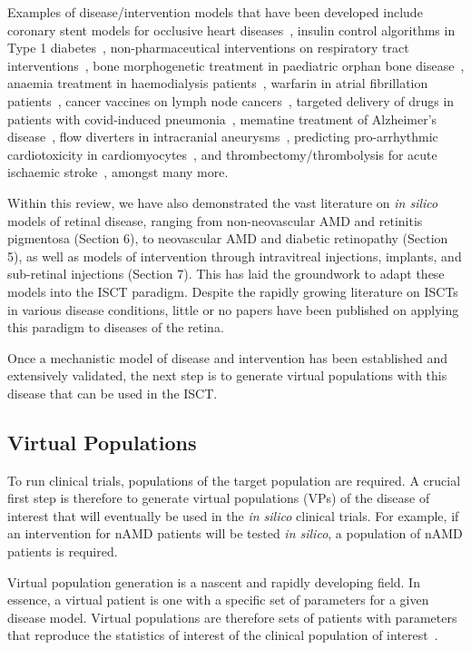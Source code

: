 \documentclass{article}
\begin{document}
Examples of disease/intervention models that have been developed include coronary stent models for occlusive heart diseases~\cite{Antonini2021, Berti2021}, insulin control algorithms in Type 1 diabetes~\cite{Kovatchev2009}, non-pharmaceutical interventions on respiratory tract interventions~\cite{Arsene2022}, bone morphogenetic treatment in paediatric orphan bone disease~\cite{Carlier2018}, anaemia treatment in haemodialysis patients~\cite{Fuertinger2018}, warfarin in atrial fibrillation patients~\cite{Ravvaz2017}, cancer vaccines on lymph node cancers~\cite{Gaffney2022}, targeted delivery of drugs in patients with covid-induced pneumonia~\cite{Wang2022}, mematine treatment of Alzheimer’s disease~\cite{Swietlik2022}, flow diverters in intracranial aneurysms~\cite{SarramiForoushani2021}, predicting pro-arrhythmic cardiotoxicity in cardiomyocytes~\cite{Passini2017}, and thrombectomy/thrombolysis for acute ischaemic stroke~\cite{Konduri2020}, amongst many more.

Within this review, we have also demonstrated the vast literature on \textit{in silico} models of retinal disease, ranging from non-neovascular AMD and retinitis pigmentosa (Section 6), to neovascular AMD and diabetic retinopathy (Section 5), as well as models of intervention through intravitreal injections, implants, and sub-retinal injections (Section 7). This has laid the groundwork to adapt these models into the ISCT paradigm. Despite the rapidly growing literature on ISCTs in various disease conditions, little or no papers have been published on applying this paradigm to diseases of the retina.

Once a mechanistic model of disease and intervention has been established and extensively validated, the next step is to generate virtual populations with this disease that can be used in the ISCT.

\subsection*{Virtual Populations}

To run clinical trials, populations of the target population are required. A crucial first step is therefore to generate virtual populations (VPs) of the disease of interest that will eventually be used in the \textit{in silico} clinical trials. For example, if an intervention for nAMD patients will be tested \textit{in silico}, a population of nAMD patients is required.

Virtual population generation is a nascent and rapidly developing field. In essence, a virtual patient is one with a specific set of parameters for a given disease model. Virtual populations are therefore sets of patients with parameters that reproduce the statistics of interest of the clinical population of interest~\cite{Allen2016}.
\end{document}
